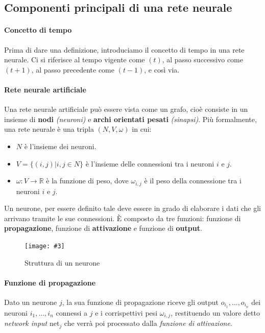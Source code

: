 \documentclass[12pt, twoside, letterpaper]{report}
\newcommand{\img}[3] {
	\begin{figure}[h]
		\caption{#1}
		\centering
		\texttt{[image: \#3]}\\
	\end{figure}
}
\begin{document}
			
		\subsection{Componenti principali di una rete neurale} 
			\paragraph{Concetto di tempo} Prima di dare una definizione, introduciamo il concetto di tempo in una rete neurale. Ci si riferisce al tempo vigente come $(t)$, al passo successivo come $(t+1)$, al passo precedente come $(t-1)$, e così via.
			\paragraph{Rete neurale artificiale}
			Una rete neurale artificiale può essere vista come un grafo, cioè consiste in un insieme di \textbf{nodi} \textit{(neuroni)} e \textbf{archi orientati pesati} \textit{(sinapsi)}. Più formalmente, una rete neurale è una tripla $(N,V, \omega)$ in cui:
			\begin{itemize}
				\item $N$ è l'insieme dei neuroni.
				\item $V = \{(i,j) | i,j \in N\}$ è l'insieme delle connessioni tra i neuroni $i$ e $j$.
				\item $\omega: V \rightarrow \mathbb{R}$ è la funzione di peso, dove $\omega_{i,j}$ è il peso della connessione tra i neuroni $i$ e $j$.
			\end{itemize}
			Un neurone, per essere definito tale deve essere in grado di elaborare i dati che gli arrivano tramite le sue connessioni. È composto da tre funzioni: funzione di \textbf{propagazione}, funzione di \textbf{attivazione} e funzione di \textbf{output}. 
			
			\img{Struttura di un neurone}{0.4}{neurone.png}
			
			 \paragraph{Funzione di propagazione} Dato un neurone $j$, la sua funzione di propagazione riceve gli output $o_{i_1}, \dots, o_{i_n}$ dei neuroni $i_1, \dots, i_n$ connessi a $j$ e i corrispettivi pesi $\omega_{i,j}$, restituendo un valore detto \textit{network input} net$_j$ che verrà poi processato dalla \textit{funzione di attivazione}. 
			 
\end{document}
